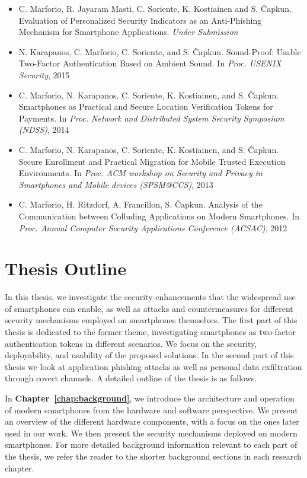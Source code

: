 \begin{itemize}
	\item C. Marforio, R. Jayaram Masti, C. Soriente, K. Kostiainen and S. \v{C}apkun. Evaluation of Personalized Security Indicators as an Anti-Phishing Mechanism for Smartphone Applications. \emph{Under Submission}
	\item N. Karapanos, C. Marforio, C. Soriente, and S. \v{C}apkun. Sound-Proof: Usable Two-Factor Authentication Based on Ambient Sound. In \emph{Proc. USENIX Security}, 2015
	\item C. Marforio, N. Karapanos, C. Soriente, K. Kostiainen, and S. \v{C}apkun. Smartphones as Practical and Secure Location Verification Tokens for Payments. In \emph{Proc. Network and Distributed System Security Symposium (NDSS)}, 2014
	\item C. Marforio, N. Karapanos, C. Soriente, K. Kostiainen, and S. \v{C}apkun. Secure Enrollment and Practical Migration for Mobile Trusted Execution Environments. In \emph{Proc. ACM workshop on Security and Privacy in Smartphones and Mobile devices (SPSM@CCS)}, 2013
	\item C. Marforio, H. Ritzdorf, A. Francillon, S. \v{C}apkun. Analysis of the Communication between Colluding Applications on Modern Smartphones. In \emph{Proc. Annual Computer Security Applications Conference (ACSAC)}, 2012
\end{itemize}

\section{Thesis Outline}
\label{sec:intro_outline}

In this thesis, we investigate the security enhancements that the widespread use of smartphones can enable, as well as attacks and countermeasures for different security mechanisms employed on smartphones themselves. The first part of this thesis is dedicated to the former theme, investigating smartphones as two-factor authentication tokens in different scenarios. We focus on the security, deployability, and usability of the proposed solutions. In the second part of this thesis we look at application phishing attacks as well as personal data exfiltration through covert channels. A detailed outline of the thesis is as follows.

In \textbf{Chapter~\ref{chap:background}}, we introduce the architecture and operation of modern smartphones from the hardware and software perspective. We present an overview of the different hardware components, with a focus on the ones later used in our work. We then present the security mechanisms deployed on modern smartphones. For more detailed background information relevant to each part of the thesis, we refer the reader to the shorter background sections in each research chapter.

